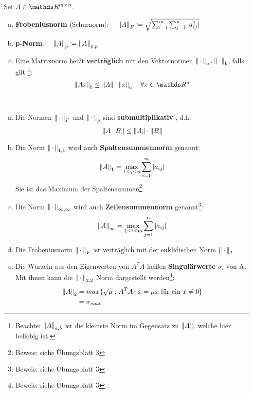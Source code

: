 \begin{Defe}
  \label{3.2.5}
  Sei $A\in \R^{m\times n}$.
  \begin{enumerate}[a)]
  \item \textbf{Frobeniusnorm} (Schurnorm):
    $ \quad \nn{A}_F \coloneqq \sqrt{\sum_{i=1}^{m}\sum_{j=1}^{n}|a_{ij}^2|}
    \index{Norm!Frobeniusnorm}$
  \item \textbf{p-Norm}: 
    $\quad \nn{A}_p \coloneqq \nn{A}_{p,p}
    \index{p-Norm}$
  \item Eine Matrixnorm heißt \textbf{verträglich}  mit den Vektornormen 
    $\left\| \,\cdot\, \right\|_a, \left\| \,\cdot\, \right\|_b$, falls gilt
    \footnote{ Beachte: $\left\| A \right\|_{a,b}$ ist die kleinste Norm im Gegensatz zu $\left\| A \right\|$, welche hier beliebig ist.}:
    \begin{gather*}
      \nn{Ax}_b \leq \nn{A}\cdot \nn{x}_a \quad \forall x\in \R^n
    \end{gather*}
  \end{enumerate}
\end{Defe}
\begin{Beme}~
  \label{3.2.6}
  \begin{enumerate}[a)]
  \item Die Normen $\left\| \,\cdot\, \right\|_F$ und $\left\| \,\cdot\, \right\|_p$ sind \textbf{submultiplikativ} , d.h.
    \begin{gather*}
      \left\| A\cdot B \right\| \leq \left\| A \right\|\cdot\left\| B \right\|
    \end{gather*}
  \item Die Norm $\left\| \,\cdot\, \right\|_{1,1}$ wird auch \textbf{Spaltensummennorm} genannt:
    \begin{gather*}
      \left\| A \right\|_1 = \max_{1\leq j \leq n}\sum_{i=1}^{m}|a_{ij}|
    \end{gather*}
    Sie ist das Maximum der Spaltensummen\footnote{Beweis: siehe Übungsblatt 3}.
  \item Die Norm $\left\| \,\cdot\, \right\|_{\infty, \infty}$ wird auch \textbf{Zeilensummennorm} 
    genannt\footnote{Beweis: siehe Übungsblatt 3}:
    \begin{gather*}
      \left\| A \right\|_\infty = \max_{1\leq i \leq m}\sum_{j=1}^{n}|a_{ij}|
    \end{gather*}
  \item Die Frobeniusnorm $\left\| \,\cdot\, \right\|_F$ ist verträglich mit der euklidischen Norm $\left\| \,\cdot\, \right\|_2$
  \item Die Wurzeln aus den Eigenwerten von $A^TA$ heißen \textbf{Singulärwerte $\sigma_i$}  von A.
    Mit ihnen kann die $\left\| \,\cdot\, \right\|_{2,2}$ Norm dargestellt werden\footnote{Beweis: siehe Übungsblatt 3}:
    \begin{align*}
      \left\| A \right\|_2 &= max \{\sqrt{\mu} : A^TA\cdot x = \mu x\text{ für ein }x\neq 0 \} \\
               & = \sigma_{max}
    \end{align*}
  \end{enumerate}
\end{Beme}


